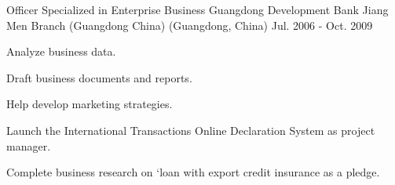 \documentclass[11pt, a4paper]{awesome-cv} %
\begin{document}
\begin{cventries}
		
	\cventry
	{Officer Specialized in Enterprise Business} %
	{Guangdong Development Bank Jiang Men Branch (Guangdong China)} %
	{(Guangdong, China)} %
	{Jul. 2006 - Oct. 2009} %
	{ %
		\begin{cvitems}
				\item {Analyze business data.}
				\item {Draft business documents and reports.}
				\item {Help develop marketing strategies.}
				\item {Launch the International Transactions Online Declaration System as project manager.}
				\item {Complete business research on ‘loan with export credit insurance as a pledge.}
		\end{cvitems}
	}
		
		
		
	
	
\end{cventries}

%

\end{document}
